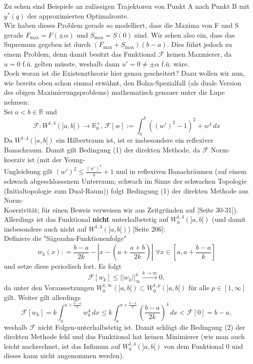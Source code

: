 Zu sehen sind Beispiele an zulässigen Trajektoren von Punkt A nach Punkt B mit \(y^*(q)\) der approximierten Optimalroute.\\
Wir haben dieses Problem gerade so modelliert, dass die Maxima von F und S \\gerade \(F_{\text{max}} = F(\pm \alpha)\) und \(S_{\text{max}} = S(0)\) sind. Wir sehen also ein, dass das Supremum gegeben ist durch \((F_{\text{max}} + S_{\text{max}})(b-a)\). Dies führt jedoch zu einem Problem, denn damit besitzt das Funktional \(\mathcal{F}\) keinen Maxmierer, da \(u = 0\) f.ü. gelten müsste, weshalb dann \(u' = 0 \neq \pm \alpha\) f.ü. wäre.\\
Doch woran ist die Existenztheorie hier genau gescheitert? Dazu wollen wir nun, wie bereits oben schon einmal erwähnt, den Bolza-Spezialfall (als duale Version des obigen Maximierungsproblems) mathematisch genauer unter die Lupe nehmen:\\
Sei \(a < b \in \mathbb{R}\) und
\begin{equation}
    \mathcal{F}:W^{1,4}(]a,b[) \to \mathbb{R}_0^+,\,\mathcal{F}[w] := \int_{a}^b ((w')^2 - 1)^2 + w^4\,dx
\end{equation}
Da \(W^{1,4}(]a,b[)\) ein Hilbertraum ist, ist er insbesondere ein reflexiver Banachraum. Damit gilt Bedingung (1) der direkten Methode, da \(\mathcal{F}\) Norm-koerziv ist (mit der Young-\\Ungleichung gilt \((w')^2 \le  \frac{(w')^4}{4} + 1\) und in reflexiven Banachräumen (auf einem schwach abgeschlossenem Unterraum; schwach im Sinne der schwachen Topologie (Initialtopologie zum Dual-Raum)) folgt Bedingung (1) der direkten Methode aus Norm-\\Koerzivität; für einen Beweis verweisen wir aus Zeitgründen auf \cite{CalcVar}[Seite 30-31]). \\Allerdings ist das Funktional \textbf{nicht} unterhalbstetig auf \(W^{1,4}_0(]a,b[)\) (und damit insbesondere auch nicht auf \(W^{1,4}(]a,b[)\)) \cite{CalcVarJost}[Seite 206]:\\
Definiere die "Sägezahn-Funktionenfolge"
\begin{equation}
    w_k(x) : = \frac{b-a}{2k} - |x - (a + \frac{a + b}{2k})| \,\, \forall x \in [a,a + \frac{b-a}{k}]
\end{equation}
und setze diese periodisch fort. Es folgt
\begin{equation}
    \mathcal{F}[w_k] \le ||w_k||^4_{\infty} \stackrel{k \to \infty}{\to} 0,
\end{equation}
da unter den Voraussetzungen \(W^{1,\infty}_0(]a,b[) \subset W^{1,p}_0(]a,b[)\) für alle \(p \in [1,\infty]\) gilt. Weiter gilt allerdings
\begin{equation}
    \mathcal{F}[w_k] = k \int_a^{a + \frac{b-a}{k}} w_k^4\, dx \le k \int_a^{a + \frac{b-a}{k}} (\frac{b-a}{2k})^4 \, dx < \mathcal{F}[0] = b - a,
\end{equation}
weshalb \(\mathcal{F}\) nicht Folgen-unterhalbstetig ist. Damit schlägt die Bedingung (2) der direkten Methode fehl und das Funktional hat keinen Minimierer (wie man auch leicht nachrechnet, ist das Infimum auf \(W^{1,4}_0(]a,b[)\) von dem Funktional 0 und dieses kann nicht angenommen werden).
